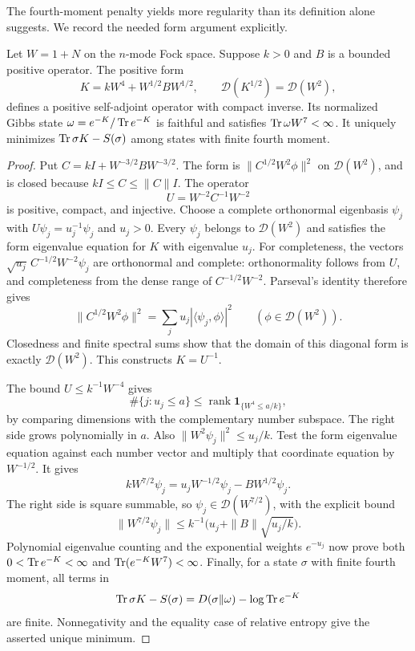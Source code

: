 The fourth-moment penalty yields more regularity than its definition
alone suggests. We record the needed form argument explicitly.

\begin{lemma}\label{lem:gibbs-regularity}
Let $W=1+N$ on the $n$-mode Fock space. Suppose $k>0$ and $B$ is a
bounded positive operator. The positive form
\[
 K=kW^4+W^{1/2}BW^{1/2},\qquad \mathcal D(K^{1/2})=\mathcal D(W^2),
\]
defines a positive self-adjoint operator with compact inverse. Its
normalized Gibbs state $\omega=e^{-K}/\operatorname{Tr} e^{-K}$ is faithful and
satisfies $\operatorname{Tr}\omega W^7<\infty$. It uniquely minimizes
$\operatorname{Tr}\sigma K-S(\sigma)$ among states with finite fourth moment.
\end{lemma}

\begin{proof}
Put $C=kI+W^{-3/2}BW^{-3/2}$. The form is
$\|C^{1/2}W^2\phi\|^2$ on $\mathcal D(W^2)$, and is closed because
$kI\le C\le\|C\|I$. The operator
\[
 U=W^{-2}C^{-1}W^{-2}
\]
is positive, compact, and injective. Choose a complete orthonormal
eigenbasis $\psi_j$ with $U\psi_j=u_j^{-1}\psi_j$ and $u_j>0$.
Every $\psi_j$ belongs to $\mathcal D(W^2)$ and satisfies the form
eigenvalue equation for $K$ with eigenvalue $u_j$.
For completeness, the vectors
$\sqrt{u_j}\,C^{-1/2}W^{-2}\psi_j$ are orthonormal and complete:
orthonormality follows from $U$, and completeness from the dense range
of $C^{-1/2}W^{-2}$. Parseval's identity therefore gives
\[
 \|C^{1/2}W^2\phi\|^2
   =\sum_j u_j|\langle\psi_j,\phi\rangle|^2
 \qquad(\phi\in\mathcal D(W^2)).
\]
Closedness and finite spectral sums show that the domain of this
diagonal form is exactly $\mathcal D(W^2)$. This constructs $K=U^{-1}$.

The bound $U\le k^{-1}W^{-4}$ gives
\[
 \#\{j:u_j\le a\}
 \le\operatorname{rank}\mathbf1_{\{W^4\le a/k\}},
\]
by comparing dimensions with the complementary number subspace.
The right side grows polynomially in $a$. Also
$\|W^2\psi_j\|^2\le u_j/k$. Test the form eigenvalue equation against
each number vector and multiply that coordinate equation by $W^{-1/2}$.
It gives
\[
 kW^{7/2}\psi_j
   =u_jW^{-1/2}\psi_j-BW^{1/2}\psi_j.
\]
The right side is square summable, so $\psi_j\in\mathcal D(W^{7/2})$,
with the explicit bound
\[
 \|W^{7/2}\psi_j\|
 \le k^{-1}\bigl(u_j+\|B\|\sqrt{u_j/k}\bigr).
\]
Polynomial eigenvalue counting and the exponential weights $e^{-u_j}$
now prove both $0<\operatorname{Tr} e^{-K}<\infty$ and
$\operatorname{Tr}(e^{-K}W^7)<\infty$. Finally, for a state $\sigma$ with finite
fourth moment, all terms in
\[
 \operatorname{Tr}\sigma K-S(\sigma)
   =D(\sigma\Vert\omega)-\log\operatorname{Tr} e^{-K}
\]
are finite. Nonnegativity and the equality case of relative entropy
give the asserted unique minimum.
\end{proof}

